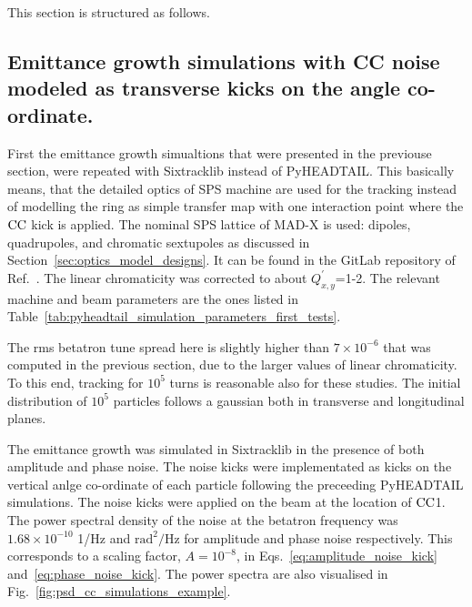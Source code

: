 This section is structured as follows. 


\subsection{Emittance growth simulations with CC noise modeled as transverse kicks on the angle co-ordinate.}\label{subsec:sixtracklib_kicks_transverse_angle}

First the emittance growth simualtions that were presented in the previouse section, were repeated with Sixtracklib instead of PyHEADTAIL. This basically means, that the detailed optics of SPS machine are used for the tracking instead of modelling the ring as simple transfer map with one interaction point where the ${\mathrm{CC}}$  kick is applied. The nominal SPS lattice of MAD-X is used: dipoles, quadrupoles, and chromatic sextupoles as discussed in Section~\ref{sec:optics_model_designs}. It can be found in the GitLab repository of Ref.~\cite{cern_optics_repo}. The linear chromaticity was corrected to about $Q^\prime_{x,y}$=1-2. The relevant machine and beam parameters are the ones listed in Table~\ref{tab:pyheadtail_simulation_parameters_first_tests}.

The rms betatron tune spread here is slightly higher than $7 \times 10^{-6}$ that was computed in the previous section, due to the larger values of linear chromaticity. To this end, tracking for $10^{5}$ turns is reasonable also for these studies. The initial distribution of $10^5$ particles follows a gaussian both in transverse and longitudinal planes.

The emittance growth was simulated in Sixtracklib in the presence of both amplitude and phase noise. The noise kicks were implementated as kicks on the vertical anlge co-ordinate of each particle following the preceeding PyHEADTAIL simulations. The noise kicks were applied on the beam at the location of ${\mathrm{CC}}$1. The power spectral density of the noise at the betatron frequency was $1.68\times 10^{-10}$ 1/Hz and $\mathrm{rad^2/Hz}$ for amplitude and phase noise respectively. This corresponds to a scaling factor, $A=10^{-8}$, in Eqs.~\eqref{eq:amplitude_noise_kick} and~\eqref{eq:phase_noise_kick}. The power spectra are also visualised in Fig.~\ref{fig:psd_cc_simulations_example}.

